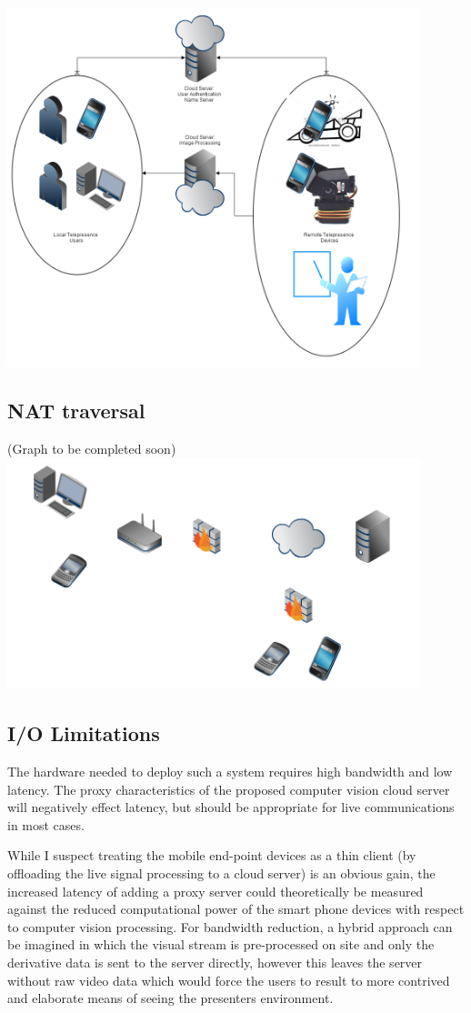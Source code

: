 \documentclass[a4paper,12pt]{report}
\begin{document}
\includegraphics[width=12cm]{overview}
	\subsection{NAT traversal}
		(Graph to be completed soon)
		\includegraphics[width=12cm]{networkModel}
	\subsection{I/O Limitations}

The hardware needed to deploy such a system requires high bandwidth and low latency. The proxy characteristics of the proposed computer vision cloud server will negatively effect latency, but should be appropriate for live communications in most cases.

While I suspect treating the mobile end-point devices as a thin client (by offloading the live signal processing to a cloud server) is an obvious gain, the increased latency of adding a proxy server could theoretically be measured against the reduced computational power of the smart phone devices with respect to computer vision processing. For bandwidth reduction, a hybrid approach can be imagined in which the visual stream is pre-processed on site and only the derivative data is sent to the server directly, however this leaves the server without raw video data which would force the users to result to more contrived and elaborate means of seeing the presenters environment.
\end{document}
